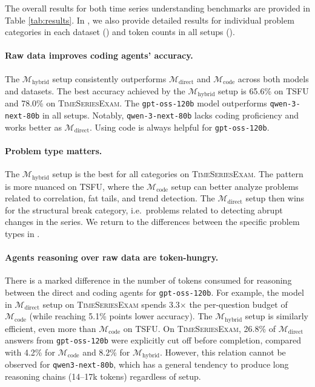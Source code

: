 \documentclass[11pt]{article}
\newcommand{\mdirect}{$\mathcal{M}_{\text{direct}}$}
\newcommand{\mcode}{$\mathcal{M}_{\text{code}}$}
\newcommand{\mhybrid}{$\mathcal{M}_{\text{hybrid}}$}
\begin{document}
The overall results for both time series understanding benchmarks are provided in Table \ref{tab:results}. In , we also provide detailed results for individual problem categories in each dataset () and token counts in all setups ().


\paragraph{Raw data improves coding agents' accuracy.} The \mhybrid{} setup consistently outperforms \mdirect{} and \mcode{} across both models and datasets. The best accuracy achieved by the \mhybrid{} setup is 65.6\% on TSFU and 78.0\% on \textsc{TimeSeriesExam}. The \texttt{gpt-oss-120b} model outperforms \texttt{qwen-3-next-80b} in all setups. Notably, \texttt{qwen-3-next-80b} lacks coding proficiency and works better as \mdirect{}. Using code is always helpful for \texttt{gpt-oss-120b}.

\paragraph{Problem type matters.}
The \mhybrid{} setup is the best for all categories on \textsc{TimeSeriesExam}. The pattern is more nuanced on TSFU, where the \mcode{} setup can better analyze problems related to correlation, fat tails, and trend detection. The \mdirect{} setup then wins for the structural break category, i.e.\ problems related to detecting abrupt changes in the series.  We return to the differences between the specific problem types in .

\paragraph{Agents reasoning over raw data are token-hungry.}

There is a marked difference in the number of tokens consumed for reasoning between the direct and coding agents for \texttt{gpt-oss-120b}. For example, the model in \mdirect{} setup on \textsc{TimeSeriesExam} spends 3.3$\times$ the per-question budget of \mcode{} (while reaching 5.1\% points lower accuracy). The \mhybrid{} setup is similarly efficient, even more than \mcode{} on TSFU. On \textsc{TimeSeriesExam}, 26.8\% of \mdirect{} answers from \texttt{gpt-oss-120b} were explicitly cut off before completion, compared with 4.2\% for \mcode{} and 8.2\% for \mhybrid{}. However, this relation cannot be observed for \texttt{qwen3-next-80b}, which has a general tendency to produce long reasoning chains (14--17k tokens) regardless of setup. 
\end{document}
